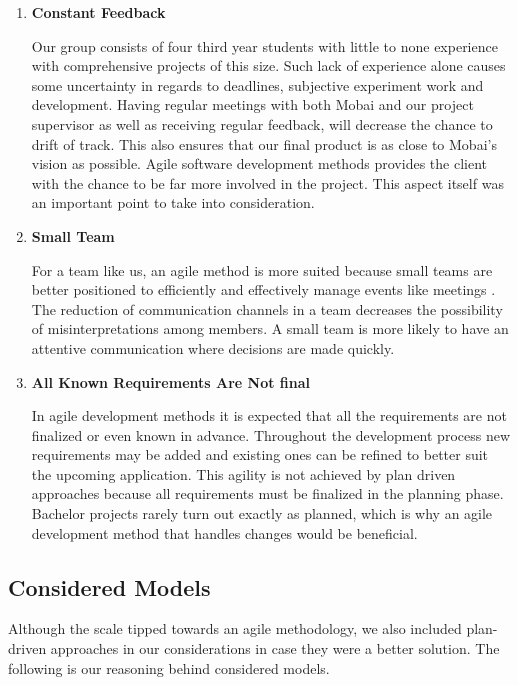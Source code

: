 \begin{enumerate}
    \item \textbf{Constant Feedback} 
    
    \hspace{0,5cm}Our group consists of four third year students with little to none experience with comprehensive projects of this size. Such lack of experience alone causes some uncertainty in regards to deadlines, subjective experiment work and development. Having regular meetings with both Mobai and our project supervisor as well as receiving regular feedback, will decrease the chance to drift of track. This also ensures that our final product is as close to Mobai's vision as possible. Agile software development methods provides the client with the chance to be far more involved in the project. This aspect itself was an important point to take into consideration.
        
    \item \textbf{Small Team}
    
    \hspace{0,5cm}For a team like us, an agile method is more suited because small teams are better positioned to efficiently and effectively manage events like meetings \cite{SmallTeams}. The reduction of communication channels in a team decreases the possibility of misinterpretations among members. A small team is more likely to have an attentive communication where decisions are made quickly.
    \newpage
    
    \item \textbf{All Known Requirements Are Not final}
    
    \hspace{0,5cm}In agile development methods it is expected that all the requirements are not finalized or even known in advance. Throughout the development process new requirements may be added and existing ones can be refined to better suit the upcoming application. This agility is not achieved by plan driven approaches because all requirements must be finalized in the planning phase. Bachelor projects rarely turn out exactly as planned, which is why an agile development method that handles changes would be beneficial. 
\end{enumerate}

\subsection{Considered Models}
Although the scale tipped towards an agile methodology, we also included plan-driven approaches in our considerations in case they were a better solution. The following is our reasoning behind considered models.  

